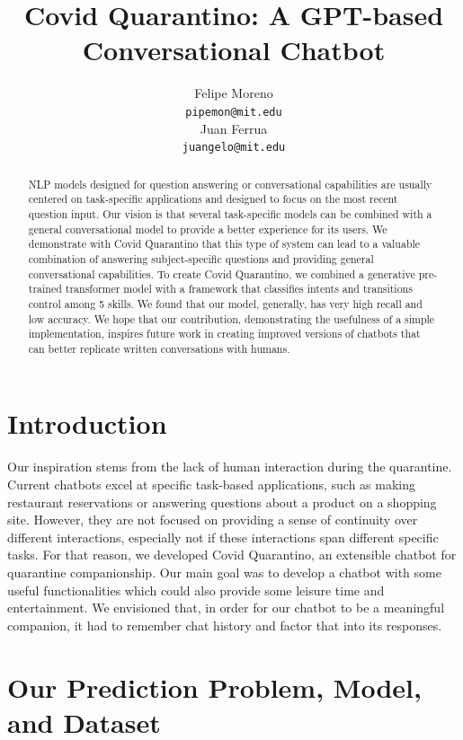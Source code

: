 \documentclass[11pt,a4paper]{article}
\title{Covid Quarantino: A GPT-based Conversational Chatbot}
\author{Felipe Moreno \\
  \texttt{pipemon@mit.edu} \\\And
  Juan Ferrua \\
  \texttt{juangelo@mit.edu} \\}
\date{}
\begin{document}
\maketitle
\begin{abstract}

NLP models designed for question answering or conversational capabilities are usually centered on task-specific applications and designed to focus on the most recent question input. Our vision is that several task-specific models can be combined with a general conversational model to provide a better experience for its users. We demonstrate with Covid Quarantino that this type of system can lead to a valuable combination of answering subject-specific questions and providing general conversational capabilities. To create Covid Quarantino, we combined a generative pre-trained transformer model with a framework that classifies intents and transitions control among 5 skills. We found that our model, generally, has very high recall and low accuracy.  We hope that our contribution, demonstrating the usefulness of a simple implementation, inspires future work in creating improved versions of chatbots that can better replicate written conversations with humans.

\end{abstract}


\section{Introduction}

Our inspiration stems from the lack of human interaction during the quarantine. Current chatbots excel at specific task-based applications, such as making restaurant reservations or answering questions about a product on a shopping site. However, they are not focused on providing a sense of continuity over different interactions, especially not if these interactions span different specific tasks. For that reason, we developed Covid Quarantino, an extensible chatbot for quarantine companionship. Our main goal was to develop a chatbot with some useful functionalities which could also provide some leisure time and entertainment. We envisioned that, in order for our chatbot to be a meaningful companion, it had to remember chat history and factor that into its responses.

\section{Our Prediction Problem, Model, and Dataset}
\end{document}
